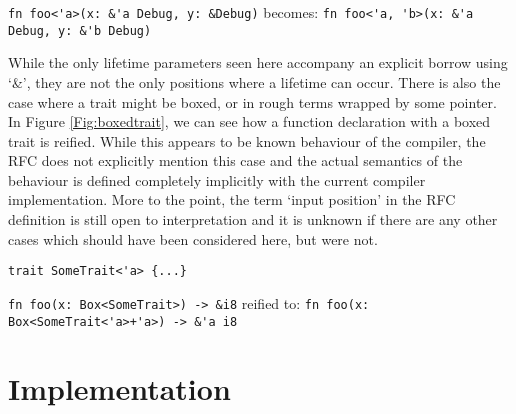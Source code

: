 \begin{fig}
{\verb|fn foo<'a>(x: &'a Debug, y: &Debug)|}\newline
becomes: {\verb|fn foo<'a, 'b>(x: &'a Debug, y: &'b Debug)|}
\caption{Partial reification -- \emph{'a} exists, \emph{'b} missing}
\label{Fig:partialrei}
\end{fig}


While the only lifetime parameters seen here accompany an explicit borrow using `\&', they are not the only positions where a lifetime can occur. There is also the case where a trait might be boxed, or in rough terms wrapped by some pointer. In Figure \ref{Fig:boxedtrait}, we can see how a function declaration with a boxed trait is reified. While this appears to be known behaviour of the compiler, the RFC does not explicitly mention this case and the actual semantics of the behaviour is defined completely implicitly with the current compiler implementation. More to the point, the term `input position' in the RFC definition is still open to interpretation and it is unknown if there are any other cases which should have been considered here, but were not.

\begin{fig}
\begin{verbatim}
trait SomeTrait<'a> {...}
\end{verbatim}
{\verb|fn foo(x: Box<SomeTrait>) -> &i8|}\newline
reified to: {\verb|fn foo(x: Box<SomeTrait<'a>+'a>) -> &'a i8|}
\caption{Reification of a boxed trait}
\label{Fig:boxedtrait}
\end{fig}



\chapter{Implementation}\label{C:impl}

